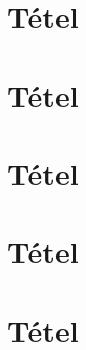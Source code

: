 \documentclass[10pt]{article}
\begin{document}
		

	\section{Tétel}
		
		

	\section{Tétel}
		
		

	\section{Tétel}
		
		

	\section{Tétel}
		
		

	\section{Tétel}
		
		
	
\end{document}
